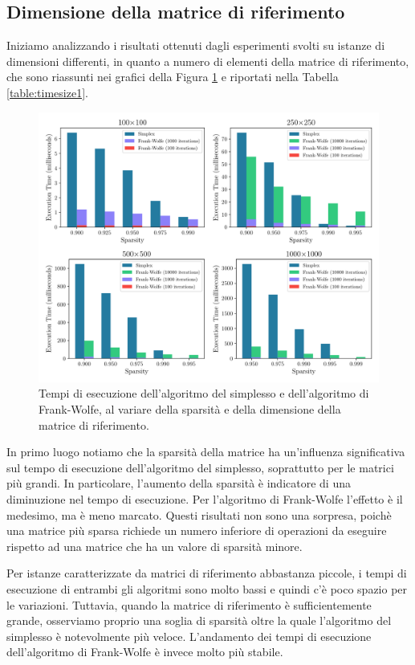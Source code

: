 \subsection{Dimensione della matrice di riferimento}
Iniziamo analizzando i risultati ottenuti dagli esperimenti svolti su istanze di dimensioni
differenti, in quanto a numero di elementi della matrice di riferimento, che sono riassunti nei grafici della Figura
\ref{fig:timesize1} e riportati nella Tabella \ref{table:timesize1}.

\begin{figure}[!ht]
    \centering
    \includegraphics[width=\textwidth]{assets/figures/timesize.pdf}
    \caption{Tempi di esecuzione dell'algoritmo del simplesso e dell'algoritmo di Frank-Wolfe, al variare della sparsità
    e della dimensione della matrice di riferimento.}
    \label{fig:timesize1}
\end{figure}

In primo luogo notiamo che la sparsità della matrice ha un'influenza significativa sul tempo di esecuzione
dell'algoritmo del simplesso, soprattutto per le matrici più grandi. In particolare, l'aumento della sparsità è
indicatore di una diminuzione nel tempo di esecuzione. Per l'algoritmo di Frank-Wolfe l'effetto è il medesimo, ma è meno
marcato. Questi risultati non sono una sorpresa, poichè una matrice più sparsa richiede un numero inferiore di
operazioni da eseguire rispetto ad una matrice che ha un valore di sparsità minore.

Per istanze caratterizzate da matrici di riferimento abbastanza piccole, i tempi di esecuzione di entrambi gli algoritmi
sono molto bassi e quindi c'è poco spazio per le variazioni. Tuttavia, quando la matrice di riferimento è
sufficientemente grande, osserviamo proprio una soglia di sparsità oltre la quale l'algoritmo del simplesso è
notevolmente più veloce. L'andamento dei tempi di esecuzione dell'algoritmo di Frank-Wolfe è invece molto più stabile.

